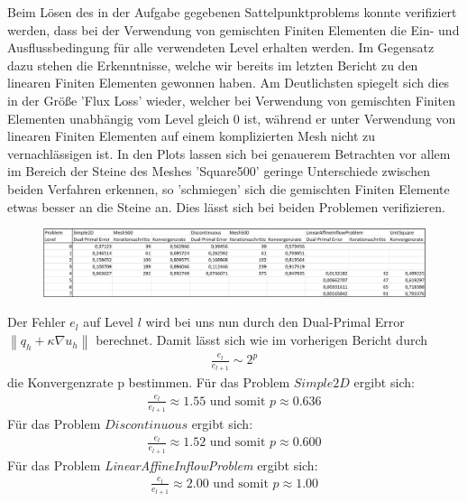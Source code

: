 Beim Lösen des in der Aufgabe gegebenen Sattelpunktproblems konnte verifiziert werden, dass bei der Verwendung von gemischten Finiten Elementen die Ein- und Ausflussbedingung für alle verwendeten Level erhalten werden.
Im Gegensatz dazu stehen die Erkenntnisse, welche wir bereits im letzten Bericht zu den linearen Finiten Elementen gewonnen haben. 
Am Deutlichsten spiegelt sich dies in der Größe 'Flux Loss' wieder, welcher bei Verwendung von gemischten Finiten Elementen unabhängig vom Level gleich 0 ist, während er unter Verwendung von linearen Finiten Elementen auf einem komplizierten Mesh nicht zu vernachlässigen ist.  \newline
In den Plots lassen sich bei genauerem Betrachten vor allem im Bereich der Steine des Meshes 'Square500' geringe Unterschiede zwischen beiden Verfahren erkennen, so 'schmiegen' sich die gemischten Finiten Elemente etwas besser an die Steine an.
Dies lässt sich bei beiden Problemen verifizieren. 


\begin{figure}[H]
	\centering
		\includegraphics[width=\textwidth]{../../19/tabelle1mixed.png} 
\end{figure}

Der Fehler $e_l$ auf Level $l$ wird bei uns nun durch den Dual-Primal Error $ \left\|q_h +\kappa \nabla u_h\right\|$ berechnet. Damit lässt sich wie im vorherigen Bericht durch
\begin{align*}
  \frac{e_l}{e_{l+1}} \sim 2^p
\end{align*}
die Konvergenzrate p bestimmen. 
\newpage
Für das Problem $Simple2D$ ergibt sich:
\begin{align*}
  \frac{e_l}{e_{l+1}} \approx 1.55 \text{ und somit } p \approx 0.636
\end{align*}
Für das Problem $Discontinuous$ ergibt sich:
\begin{align*}
  \frac{e_l}{e_{l+1}} \approx 1.52 \text{ und somit } p \approx 0.600
\end{align*}
Für das Problem \emph{LinearAffineInflowProblem} ergibt sich:
\begin{align*}
  \frac{e_l}{e_{l+1}} \approx 2.00 \text{ und somit } p \approx 1.00
\end{align*}
